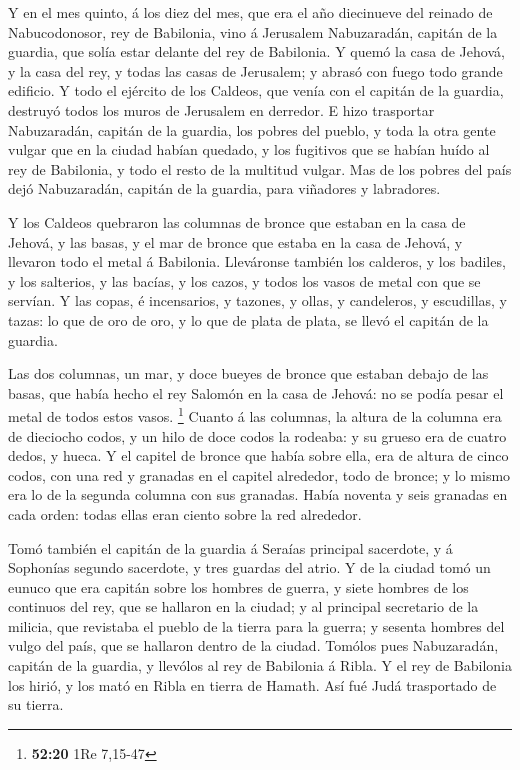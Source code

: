  Y en el mes quinto, á los diez del mes, que era el año
diecinueve del reinado de Nabucodonosor, rey de Babilonia, vino á
Jerusalem Nabuzaradán, capitán de la guardia, que solía estar delante
del rey de Babilonia.  Y quemó la casa de Jehová, y la casa
del rey, y todas las casas de Jerusalem; y abrasó con fuego todo grande
edificio.  Y todo el ejército de los Caldeos, que venía con
el capitán de la guardia, destruyó todos los muros de Jerusalem en
derredor.  E hizo trasportar Nabuzaradán, capitán de la
guardia, los pobres del pueblo, y toda la otra gente vulgar que en la
ciudad habían quedado, y los fugitivos que se habían huído al rey de
Babilonia, y todo el resto de la multitud vulgar.  Mas de
los pobres del país dejó Nabuzaradán, capitán de la guardia, para
viñadores y labradores.

 Y los Caldeos quebraron las columnas de bronce que estaban
en la casa de Jehová, y las basas, y el mar de bronce que estaba en la
casa de Jehová, y llevaron todo el metal á Babilonia. 
Lleváronse también los calderos, y los badiles, y los salterios, y las
bacías, y los cazos, y todos los vasos de metal con que se servían.
 Y las copas, é incensarios, y tazones, y ollas, y
candeleros, y escudillas, y tazas: lo que de oro de oro, y lo que de
plata de plata, se llevó el capitán de la guardia.

 Las dos columnas, un mar, y doce bueyes de bronce que
estaban debajo de las basas, que había hecho el rey Salomón en la casa
de Jehová: no se podía pesar el metal de todos estos vasos. \footnote{\textbf{52:20}
  1Re 7,15-47}  Cuanto á las columnas, la altura de la
columna era de dieciocho codos, y un hilo de doce codos la rodeaba: y su
grueso era de cuatro dedos, y hueca.  Y el capitel de
bronce que había sobre ella, era de altura de cinco codos, con una red y
granadas en el capitel alrededor, todo de bronce; y lo mismo era lo de
la segunda columna con sus granadas.  Había noventa y seis
granadas en cada orden: todas ellas eran ciento sobre la red alrededor.

 Tomó también el capitán de la guardia á Seraías principal
sacerdote, y á Sophonías segundo sacerdote, y tres guardas del atrio.
 Y de la ciudad tomó un eunuco que era capitán sobre los
hombres de guerra, y siete hombres de los continuos del rey, que se
hallaron en la ciudad; y al principal secretario de la milicia, que
revistaba el pueblo de la tierra para la guerra; y sesenta hombres del
vulgo del país, que se hallaron dentro de la ciudad. 
Tomólos pues Nabuzaradán, capitán de la guardia, y llevólos al rey de
Babilonia á Ribla.  Y el rey de Babilonia los hirió, y los
mató en Ribla en tierra de Hamath. Así fué Judá trasportado de su
tierra.

